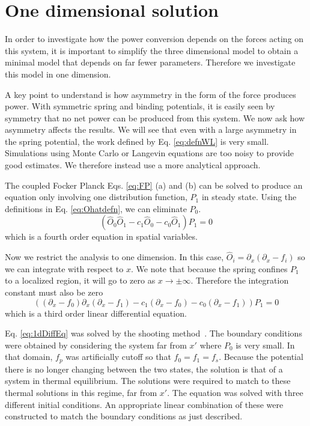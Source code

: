 \documentclass[journal = mamobx, manuscript = article]{achemso}
\def\Ohat{\hat O}
\def\px{\partial_x}
\begin{document}
\section{One dimensional solution}
\label{sec:1Dsol}
In order to investigate how the power conversion depends on the forces acting on
this system, it is important to simplify the three dimensional model to obtain
a minimal model that depends on far fewer parameters. Therefore we investigate
this model in one dimension.

A key point to understand is how asymmetry in the form of the force produces
power. With symmetric spring and binding potentials, it is easily seen by
symmetry that no net power can be produced from this system. We now ask how
asymmetry affects the results. We will see that even with a large asymmetry
in the spring potential, the work defined by Eq. \ref{eq:defnWL} is very small.
Simulations using Monte Carlo or Langevin equations are too noisy to provide
good estimates. We therefore instead use a more analytical approach.

The coupled Focker Planck Eqs. \ref{eq:FP} (a) and (b) can be solved to produce
an equation only involving one distribution function, $P_1$ in steady state.
Using the definitions in Eq. \ref{eq:Ohatdefn}, we can eliminate $P_0$.
\begin{equation}
(\Ohat_0\Ohat_1 - c_1 \Ohat_0 - c_0 \Ohat_1) P_1 = 0
\end{equation}
which is a fourth order equation in spatial variables.

Now we restrict the analysis to one dimension. In this case, $\Ohat_i = \px(\px-f_i)$
so we can integrate with respect to $x$. We note that because the spring
confines $P_1$ to a localized region, it will go to zero as
$x\rightarrow\pm\infty$. Therefore the integration constant must also be zero
\begin{equation}
\label{eq:1dDiffEq}
((\px-f_0)\px(\px-f_1) - c_1 (\px-f_0) - c_0 (\px-f_1)) P_1 = 0
\end{equation}
which is a third order linear differential equation.

Eq. \ref{eq:1dDiffEq} was solved by the shooting method~\cite{ShootingMethod}.
The boundary conditions were obtained by considering the system far from $x'$ where $P_0$ is very small. In that
domain, $f_p$ was artificially cutoff so that $f_0=f_1=f_s$. Because the
potential there is no longer changing between the two states, the solution is
that of a system in thermal equilibrium. The solutions were required to match to
these thermal solutions in this regime, far from $x'$.
The equation was solved with three different initial conditions. An appropriate
linear combination of these were constructed to match the boundary conditions as
just described.
\end{document}
